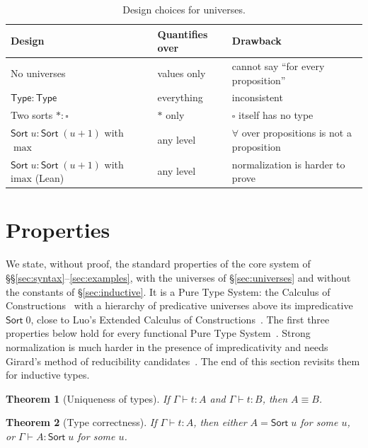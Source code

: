 \documentclass[acmsmall,screen,nonacm]{acmart}
\newtheorem{theorem}{Theorem}
\newcommand{\Sort}[1]{\mathsf{Sort}\;#1}
\newcommand{\conv}{\equiv}
\newcommand{\imax}{\mathrm{imax}}
\begin{document}
\begin{table}[ht]
\centering
\caption{Design choices for universes.}
\label{tab:universes}
\small
\begin{tabularx}{\textwidth}{@{}l l X@{}}
\toprule
\textbf{Design} & \textbf{Quantifies over} & \textbf{Drawback} \\
\midrule
No universes & values only & cannot say ``for every proposition'' \\
$\mathsf{Type} : \mathsf{Type}$ & everything & inconsistent \\
Two sorts $\ast : \square$ & $\ast$ only & $\square$ itself has no type \\
$\Sort{u} : \Sort{(u+1)}$ with $\max$ & any level & $\forall$ over propositions is not a proposition \\
$\Sort{u} : \Sort{(u+1)}$ with $\imax$ (Lean) & any level & normalization is harder to prove \\
\bottomrule
\end{tabularx}
\end{table}

\section{Properties}
\label{sec:properties}

We state, without proof, the standard properties of the core system of \S\S\ref{sec:syntax}--\ref{sec:examples}, with the universes of \S\ref{sec:universes} and without the constants of \S\ref{sec:inductive}.
It is a Pure Type System: the Calculus of Constructions~\cite{coquand1988calculus} with a hierarchy of predicative universes above its impredicative $\Sort{0}$,
close to Luo's Extended Calculus of Constructions~\cite{luo1990extended}.
The first three properties below hold for every functional Pure Type System~\cite{barendregt1992lambda}.
Strong normalization is much harder in the presence of impredicativity and needs Girard's method of reducibility candidates~\cite{girard1972interpretation,coquand1988calculus,luo1990extended}.
The end of this section revisits them for inductive types.

\begin{theorem}[Uniqueness of types]
If $\Gamma \vdash t : A$ and $\Gamma \vdash t : B$, then $A \conv B$.
\end{theorem}

\begin{theorem}[Type correctness]
If $\Gamma \vdash t : A$, then either $A = \Sort{u}$ for some $u$, or $\Gamma \vdash A : \Sort{u}$ for some $u$.
\end{theorem}
\end{document}
